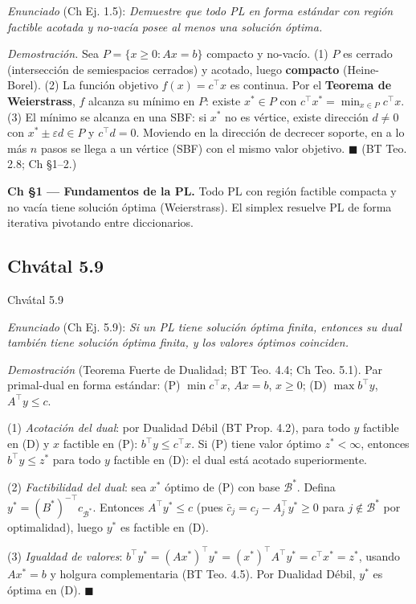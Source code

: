\documentclass[12pt]{article}
\theoremstyle{plain}
\begin{document}
\begin{solucion}

\noindent\textit{Enunciado} (Ch Ej. 1.5): \textit{Demuestre que todo PL en forma estándar con región factible acotada y no-vacía posee al menos una solución óptima.}

\noindent\textit{Demostración.} Sea $P=\{x\geq 0: Ax=b\}$ compacto y no-vacío. (1) $P$ es cerrado (intersección de semiespacios cerrados) y acotado, luego \textbf{compacto} (Heine-Borel). (2) La función objetivo $f(x)=c^\top x$ es continua. Por el \textbf{Teorema de Weierstrass}, $f$ alcanza su mínimo en $P$: existe $x^*\in P$ con $c^\top x^*=\min_{x\in P}c^\top x$. (3) El mínimo se alcanza en una SBF: si $x^*$ no es vértice, existe dirección $d\neq 0$ con $x^*\pm\varepsilon d\in P$ y $c^\top d=0$. Moviendo en la dirección de decrecer soporte, en a lo más $n$ pasos se llega a un vértice (SBF) con el mismo valor objetivo. $\blacksquare$ (BT Teo. 2.8; Ch §1--2.)

\end{solucion}

\begin{teofund}
\textbf{Ch §1 — Fundamentos de la PL.} Todo PL con región factible compacta y no vacía tiene solución óptima (Weierstrass). El simplex resuelve PL de forma iterativa pivotando entre diccionarios.
\end{teofund}

\bigskip

\subsection{Chvátal 5.9}

Chvátal 5.9

\begin{solucion}

\noindent\textit{Enunciado} (Ch Ej. 5.9): \textit{Si un PL tiene solución óptima finita, entonces su dual también tiene solución óptima finita, y los valores óptimos coinciden.}

\noindent\textit{Demostración} (Teorema Fuerte de Dualidad; BT Teo. 4.4; Ch Teo. 5.1). Par primal-dual en forma estándar: (P) $\min c^\top x$, $Ax=b$, $x\geq 0$; (D) $\max b^\top y$, $A^\top y\leq c$.

(1) \textit{Acotación del dual}: por Dualidad Débil (BT Prop. 4.2), para todo $y$ factible en (D) y $x$ factible en (P): $b^\top y\leq c^\top x$. Si (P) tiene valor óptimo $z^*<\infty$, entonces $b^\top y\leq z^*$ para todo $y$ factible en (D): el dual está acotado superiormente.

(2) \textit{Factibilidad del dual}: sea $x^*$ óptimo de (P) con base $\mathcal{B}^*$. Defina $y^*=(B^*)^{-\top}c_{\mathcal{B}^*}$. Entonces $A^\top y^*\leq c$ (pues $\bar{c}_j=c_j-A_j^\top y^*\geq 0$ para $j\notin\mathcal{B}^*$ por optimalidad), luego $y^*$ es factible en (D).

(3) \textit{Igualdad de valores}: $b^\top y^*=(Ax^*)^\top y^*=(x^*)^\top A^\top y^*=c^\top x^*=z^*$, usando $Ax^*=b$ y holgura complementaria (BT Teo. 4.5). Por Dualidad Débil, $y^*$ es óptima en (D). $\blacksquare$

\end{solucion}
\end{document}
